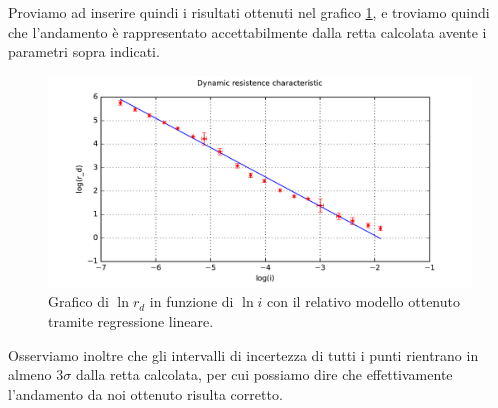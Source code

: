 Proviamo ad inserire quindi i risultati ottenuti nel grafico \ref{fig:gZr}, e troviamo quindi che l'andamento è rappresentato accettabilmente dalla retta calcolata avente i parametri sopra indicati. \\

\begin{figure} [h]
    \centering
    \includegraphics[width=\textwidth]{fig4Z.pdf} 
    \caption{Grafico di $\ln{r_d}$ in funzione di $\ln{i}$ con il relativo modello ottenuto tramite regressione lineare.}
    \label{fig:gZr}
\end{figure}

Osserviamo inoltre che gli intervalli di incertezza di tutti i punti rientrano in almeno 3$\sigma$ dalla retta calcolata, per cui possiamo dire che effettivamente l'andamento da noi ottenuto risulta corretto. 